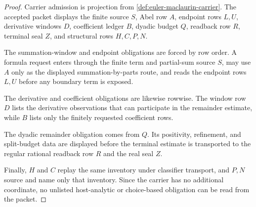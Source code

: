 \begin{proof}
Carrier admission is projection from \autoref{def:euler-maclaurin-carrier}. The accepted packet displays the finite source $S$, Abel row $A$, endpoint rows $L,U$, derivative windows $D$, coefficient ledger $B$, dyadic budget $Q$, readback row $R$, terminal seal $Z$, and structural rows $H,C,P,N$.

The summation-window and endpoint obligations are forced by row order. A formula request enters through the finite term and partial-sum source $S$, may use $A$ only as the displayed summation-by-parts route, and reads the endpoint rows $L,U$ before any boundary term is exposed.

The derivative and coefficient obligations are likewise rowwise. The window row $D$ lists the derivative observations that can participate in the remainder estimate, while $B$ lists only the finitely requested coefficient rows.

The dyadic remainder obligation comes from $Q$. Its positivity, refinement, and split-budget data are displayed before the terminal estimate is transported to the regular rational readback row $R$ and the real seal $Z$.

Finally, $H$ and $C$ replay the same inventory under classifier transport, and $P,N$ source and name only that inventory. Since the carrier has no additional coordinate, no unlisted host-analytic or choice-based obligation can be read from the packet.
\end{proof}


